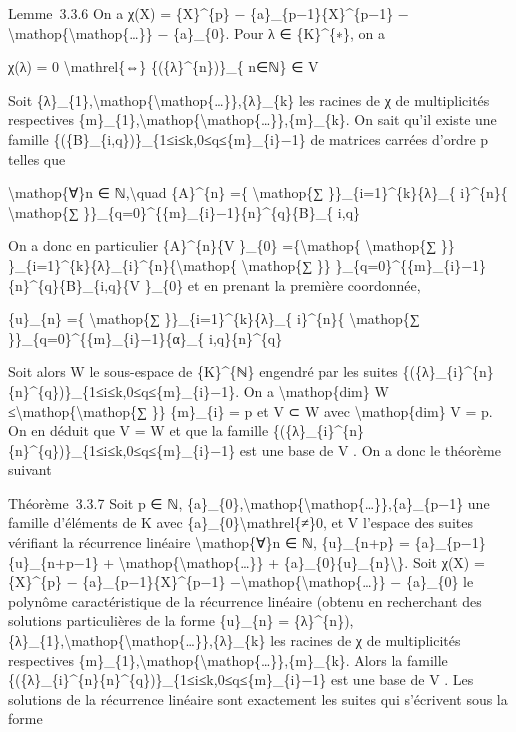 \documentclass[]{article}
\begin{document}
Lemme~3.3.6 On a χ(X) = \{X\}\^{}\{p\} − \{a\}\_\{p−1\}\{X\}\^{}\{p−1\}
−\textbackslash{}mathop\{\textbackslash{}mathop\{\ldots{}\}\} −
\{a\}\_\{0\}. Pour λ ∈ \{K\}\^{}\{∗\}, on a

χ(λ) = 0 \textbackslash{}mathrel\{⇔\} \{(\{λ\}\^{}\{n\})\}\_\{ n∈ℕ\} ∈ V

Soit
\{λ\}\_\{1\},\textbackslash{}mathop\{\textbackslash{}mathop\{\ldots{}\}\},\{λ\}\_\{k\}
les racines de χ de multiplicités respectives
\{m\}\_\{1\},\textbackslash{}mathop\{\textbackslash{}mathop\{\ldots{}\}\},\{m\}\_\{k\}.
On sait qu'il existe une famille
\{(\{B\}\_\{i,q\})\}\_\{1≤i≤k,0≤q≤\{m\}\_\{i\}−1\} de matrices carrées
d'ordre p telles que

\textbackslash{}mathop\{∀\}n ∈ ℕ,\textbackslash{}quad \{A\}\^{}\{n\} =\{
\textbackslash{}mathop\{∑ \}\}\_\{i=1\}\^{}\{k\}\{λ\}\_\{ i\}\^{}\{n\}\{
\textbackslash{}mathop\{∑
\}\}\_\{q=0\}\^{}\{\{m\}\_\{i\}−1\}\{n\}\^{}\{q\}\{B\}\_\{ i,q\}

On a donc en particulier \{A\}\^{}\{n\}\{V \}\_\{0\}
=\{\textbackslash{}mathop\{ \textbackslash{}mathop\{∑ \}\}
\}\_\{i=1\}\^{}\{k\}\{λ\}\_\{i\}\^{}\{n\}\{\textbackslash{}mathop\{
\textbackslash{}mathop\{∑ \}\}
\}\_\{q=0\}\^{}\{\{m\}\_\{i\}−1\}\{n\}\^{}\{q\}\{B\}\_\{i,q\}\{V
\}\_\{0\} et en prenant la première coordonnée,

\{u\}\_\{n\} =\{ \textbackslash{}mathop\{∑
\}\}\_\{i=1\}\^{}\{k\}\{λ\}\_\{ i\}\^{}\{n\}\{ \textbackslash{}mathop\{∑
\}\}\_\{q=0\}\^{}\{\{m\}\_\{i\}−1\}\{α\}\_\{ i,q\}\{n\}\^{}\{q\}

Soit alors W le sous-espace de \{K\}\^{}\{ℕ\} engendré par les suites
\{(\{λ\}\_\{i\}\^{}\{n\}\{n\}\^{}\{q\})\}\_\{1≤i≤k,0≤q≤\{m\}\_\{i\}−1\}.
On a \textbackslash{}mathop\{dim\} W
≤\textbackslash{}mathop\{\textbackslash{}mathop\{∑ \}\} \{m\}\_\{i\} = p
et V ⊂ W avec \textbackslash{}mathop\{dim\} V = p. On en déduit que V =
W et que la famille
\{(\{λ\}\_\{i\}\^{}\{n\}\{n\}\^{}\{q\})\}\_\{1≤i≤k,0≤q≤\{m\}\_\{i\}−1\}
est une base de V . On a donc le théorème suivant

Théorème~3.3.7 Soit p ∈ ℕ,
\{a\}\_\{0\},\textbackslash{}mathop\{\textbackslash{}mathop\{\ldots{}\}\},\{a\}\_\{p−1\}
une famille d'éléments de K avec
\{a\}\_\{0\}\textbackslash{}mathrel\{≠\}0, et V l'espace des suites
vérifiant la récurrence linéaire \textbackslash{}mathop\{∀\}n ∈ ℕ,
\{u\}\_\{n+p\} = \{a\}\_\{p−1\}\{u\}\_\{n+p−1\} +
\textbackslash{}mathop\{\textbackslash{}mathop\{\ldots{}\}\} +
\{a\}\_\{0\}\{u\}\_\{n\}\textbackslash{}\}. Soit χ(X) = \{X\}\^{}\{p\} −
\{a\}\_\{p−1\}\{X\}\^{}\{p−1\}
−\textbackslash{}mathop\{\textbackslash{}mathop\{\ldots{}\}\} −
\{a\}\_\{0\} le polynôme caractéristique de la récurrence linéaire
(obtenu en recherchant des solutions particulières de la forme
\{u\}\_\{n\} = \{λ\}\^{}\{n\}),
\{λ\}\_\{1\},\textbackslash{}mathop\{\textbackslash{}mathop\{\ldots{}\}\},\{λ\}\_\{k\}
les racines de χ de multiplicités respectives
\{m\}\_\{1\},\textbackslash{}mathop\{\textbackslash{}mathop\{\ldots{}\}\},\{m\}\_\{k\}.
Alors la famille
\{(\{λ\}\_\{i\}\^{}\{n\}\{n\}\^{}\{q\})\}\_\{1≤i≤k,0≤q≤\{m\}\_\{i\}−1\}
est une base de V . Les solutions de la récurrence linéaire sont
exactement les suites qui s'écrivent sous la forme
\end{document}

